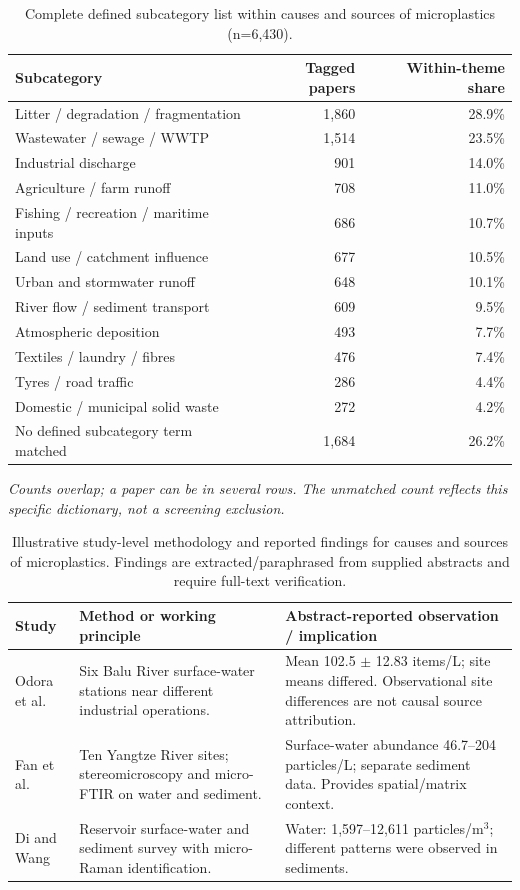 \documentclass[10pt,a4paper]{article}
\begin{document}
\begin{table}[H]\centering\footnotesize
\caption{Complete defined subcategory list within causes and sources of microplastics (n=6,430).}
\begin{tabularx}{\linewidth}{@{}Xrr@{}}\toprule Subcategory & Tagged papers & Within-theme share \\ \midrule
Litter / degradation / fragmentation & 1,860 & 28.9\% \\
Wastewater / sewage / WWTP & 1,514 & 23.5\% \\
Industrial discharge & 901 & 14.0\% \\
Agriculture / farm runoff & 708 & 11.0\% \\
Fishing / recreation / maritime inputs & 686 & 10.7\% \\
Land use / catchment influence & 677 & 10.5\% \\
Urban and stormwater runoff & 648 & 10.1\% \\
River flow / sediment transport & 609 & 9.5\% \\
Atmospheric deposition & 493 & 7.7\% \\
Textiles / laundry / fibres & 476 & 7.4\% \\
Tyres / road traffic & 286 & 4.4\% \\
Domestic / municipal solid waste & 272 & 4.2\% \\
\midrule
No defined subcategory term matched & 1,684 & 26.2\% \\
\bottomrule\end{tabularx}\end{table}
\noindent\footnotesize\emph{Counts overlap; a paper can be in several rows. The unmatched count reflects this specific dictionary, not a screening exclusion.}\normalsize
\begin{table}[H]\centering\scriptsize
\caption{Illustrative study-level methodology and reported findings for causes and sources of microplastics. Findings are extracted/paraphrased from supplied abstracts and require full-text verification.}
\begin{tabularx}{\linewidth}{@{}p{2.8cm}XX@{}}\toprule Study & Method or working principle & Abstract-reported observation / implication \\ \midrule
Odora et al. \cite{MPWE00007} & Six Balu River surface-water stations near different industrial operations. & Mean 102.5 $\pm$ 12.83 items/L; site means differed. Observational site differences are not causal source attribution. \\[2pt]
Fan et al. \cite{MPWE00013} & Ten Yangtze River sites; stereomicroscopy and micro-FTIR on water and sediment. & Surface-water abundance 46.7--204 particles/L; separate sediment data. Provides spatial/matrix context. \\[2pt]
Di and Wang \cite{MPWE00126} & Reservoir surface-water and sediment survey with micro-Raman identification. & Water: 1,597--12,611 particles/m$^3$; different patterns were observed in sediments. \\[2pt]
\bottomrule\end{tabularx}\end{table}
\clearpage
\end{document}
